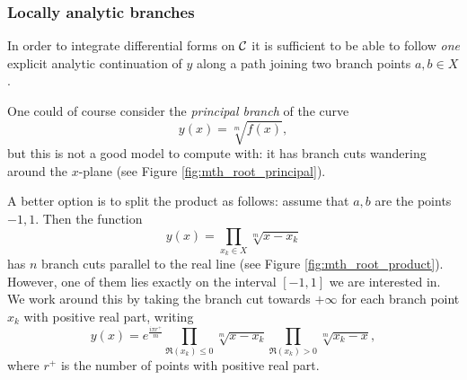 \documentclass[main.tex]{subfiles}
\begin{document}
  \subsubsection{Locally analytic branches}\label{subsubsec:analytic_branches}

  In order to integrate differential forms on $\mathcal{C}$
  it is sufficient to be able to follow \emph{one} explicit analytic continuation of $y$ along a
  path joining two branch points $a, b \in X$.

  One could of course consider the \emph{principal branch} of the curve
  \begin{equation*}
      y(x) = \sqrt[m]{f(x)},
  \end{equation*}
  but this is not a good model to compute with: it has branch cuts
  wandering around the $x$-plane (see Figure \ref{fig:mth_root_principal}).
  
  A better option is to split the product as follows:
  assume that $a,b$ are the points $-1,1$. Then the function
  \begin{equation*}
      y(x) = \prod_{x_k\in X}\sqrt[m]{x-x_k}
  \end{equation*}
  has $n$ branch cuts parallel to the real line (see Figure \ref{fig:mth_root_product}).
  However, one of them lies exactly on the interval $[-1,1]$ we are interested in. We work around this
  by taking the branch cut towards $+\infty$ for each branch point $x_k$ with positive real part, writing
  \begin{equation*}
      y(x) = e^{\frac{iπr^+}m}\prod_{\Re(x_k)\leq0}\sqrt[m]{x-x_k} \prod_{\Re(x_k)>0}\sqrt[m]{x_k-x},
  \end{equation*}
  where $r^+$ is the number of points with positive real part.
  
\end{document}
